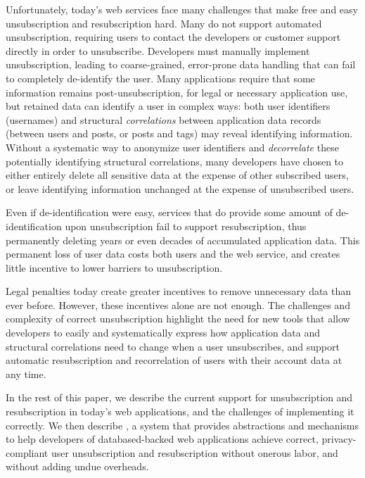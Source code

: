 Unfortunately, today's web services face many challenges that make free and easy unsubscription and
resubscription hard. Many do not support automated unsubscription, requiring users to 
contact the developers or customer support directly in order to unsubscribe.
Developers must manually implement unsubscription, leading to coarse-grained, error-prone data
handling that can fail to completely de-identify the user. Many applications require that some
information remains post-unsubscription, for legal or necessary application use, but retained data
can identify a user in complex ways: both user identifiers (\eg usernames) and structural
\emph{correlations} between application data records (\eg between users and posts, or posts and
tags) may reveal identifying information.  Without a systematic way to anonymize user identifiers
and \emph{decorrelate} these potentially identifying structural correlations, many developers have
chosen to either entirely delete all sensitive data at the expense of other subscribed users, or
leave identifying information unchanged at the expense of unsubscribed users.

Even if de-identification were easy, services that do provide some amount of de-identification upon
unsubscription fail to support resubscription, thus permanently deleting years or even decades of
accumulated application data.  This permanent loss of user data costs both users and the web
service, and creates little incentive to lower barriers to unsubscription.  

Legal penalties today create greater incentives to remove unnecessary data than ever before.
However, these incentives alone are not enough. The challenges and complexity of
correct unsubscription highlight the need for new tools that allow developers to easily and
systematically express how application data and structural correlations need to change when a user
unsubscribes, and support automatic resubscription and recorrelation of users with their account
data at any time.
%

In the rest of this paper, we describe the current support for unsubscription and resubscription in
today's web applications, and the challenges of implementing it correctly.  We then describe \name, a
system that provides abstractions and mechanisms to help developers of databased-backed web
applications achieve correct, privacy-compliant user unsubscription and resubscription without
onerous labor, and without adding undue overheads.
